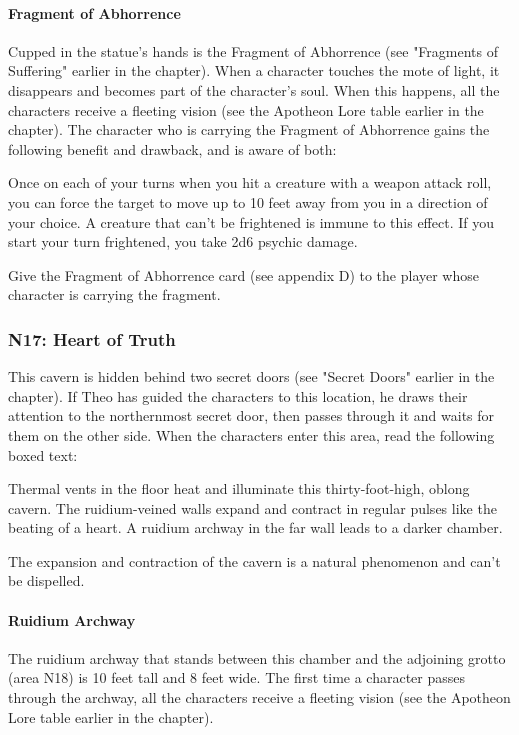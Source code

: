 \documentclass[10pt,a4,twoside,twocolumn,openany,nodeprecatedcode]{dndbook}
\begin{document}
\paragraph{Fragment of Abhorrence}
Cupped in the statue's hands is the Fragment of Abhorrence (see "Fragments of Suffering" earlier in the chapter). When a character touches the mote of light, it disappears and becomes part of the character's soul. When this happens, all the characters receive a fleeting vision (see the Apotheon Lore table earlier in the chapter).
The character who is carrying the Fragment of Abhorrence gains the following benefit and drawback, and is aware of both:
\begin{DndComment}{}
{{Once on each of your turns when you hit a creature with a weapon attack roll, you can force the target to move up to 10 feet away from you in a direction of your choice. A creature that can't be frightened is immune to this effect.}}
{{If you start your turn frightened, you take 2d6 psychic damage.}}
\end{DndComment}

Give the Fragment of Abhorrence card (see appendix D) to the player whose character is carrying the fragment.
\subsubsection{N17: Heart of Truth}
This cavern is hidden behind two secret doors (see "Secret Doors" earlier in the chapter). If Theo has guided the characters to this location, he draws their attention to the northernmost secret door, then passes through it and waits for them on the other side.
When the characters enter this area, read the following boxed text:
\begin{DndReadAloud}{}
Thermal vents in the floor heat and illuminate this thirty-foot-high, oblong cavern. The ruidium-veined walls expand and contract in regular pulses like the beating of a heart. A ruidium archway in the far wall leads to a darker chamber.
\end{DndReadAloud}

The expansion and contraction of the cavern is a natural phenomenon and can't be dispelled.
\paragraph{Ruidium Archway}
The ruidium archway that stands between this chamber and the adjoining grotto (area N18) is 10 feet tall and 8 feet wide. The first time a character passes through the archway, all the characters receive a fleeting vision (see the Apotheon Lore table earlier in the chapter).
\end{document}
